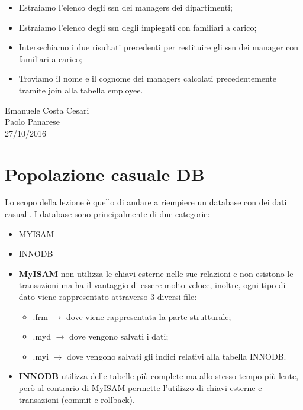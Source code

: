 \begin{itemize}
\begin{itemize}

\item Estraiamo l’elenco degli ssn dei managers dei dipartimenti;
\item Estraiamo l’elenco degli ssn degli impiegati con familiari a carico;
\item Intersechiamo i due risultati precedenti per restituire gli ssn dei manager con familiari a carico;
\item Troviamo il nome e il cognome dei managers calcolati precedentemente tramite join alla tabella employee. 

\end{itemize}

\end{itemize}


\begin{flushright}Emanuele Costa Cesari\\Paolo Panarese\\27/10/2016\end{flushright}


\section{Popolazione casuale DB}

Lo scopo della lezione è quello di andare a riempiere un database con dei dati casuali. 
I database sono principalmente di due categorie: 

\begin{itemize}
\item MYISAM 
\item INNODB
\end{itemize}

\begin{itemize}

\item{\textbf{MyISAM}} non utilizza le chiavi esterne nelle sue relazioni e non esistono le transazioni ma ha il vantaggio di essere molto veloce, inoltre, ogni tipo di dato viene rappresentato attraverso 3 diversi file: 

\begin{itemize}

\item{.frm} $\rightarrow$ dove viene rappresentata la parte strutturale;
\item{.myd} $\rightarrow$ dove vengono salvati i dati;
\item{.myi} $\rightarrow$ dove vengono salvati gli indici relativi alla tabella  
INNODB.

\end{itemize}

\item{\textbf{INNODB}} utilizza delle tabelle più complete ma allo stesso tempo più lente, però al contrario di MyISAM permette l’utilizzo di chiavi esterne e transazioni (commit e rollback).

\end{itemize}

